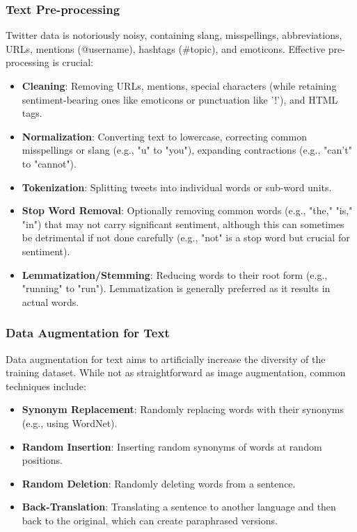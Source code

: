 \subsubsection{Text Pre-processing}
Twitter data is notoriously noisy, containing slang, misspellings, abbreviations, URLs, mentions (@username), hashtags (\#topic), and emoticons. Effective pre-processing is crucial:

\begin{itemize}
    \item \textbf{Cleaning}: Removing URLs, mentions, special characters (while retaining sentiment-bearing ones like emoticons or punctuation like '!'), and HTML tags.
    \item \textbf{Normalization}: Converting text to lowercase, correcting common misspellings or slang (e.g., "u" to "you"), expanding contractions (e.g., "can't" to "cannot").
    \item \textbf{Tokenization}: Splitting tweets into individual words or sub-word units.
    \item \textbf{Stop Word Removal}: Optionally removing common words (e.g., "the," "is," "in") that may not carry significant sentiment, although this can sometimes be detrimental if not done carefully (e.g., "not" is a stop word but crucial for sentiment).
    \item \textbf{Lemmatization/Stemming}: Reducing words to their root form (e.g., "running" to "run"). Lemmatization is generally preferred as it results in actual words.
\end{itemize}

\subsubsection{Data Augmentation for Text}
Data augmentation for text aims to artificially increase the diversity of the training dataset. While not as straightforward as image augmentation, common techniques include:

\begin{itemize}
    \item \textbf{Synonym Replacement}: Randomly replacing words with their synonyms (e.g., using WordNet).
    \item \textbf{Random Insertion}: Inserting random synonyms of words at random positions.
    \item \textbf{Random Deletion}: Randomly deleting words from a sentence.
    \item \textbf{Back-Translation}: Translating a sentence to another language and then back to the original, which can create paraphrased versions.
\end{itemize}

